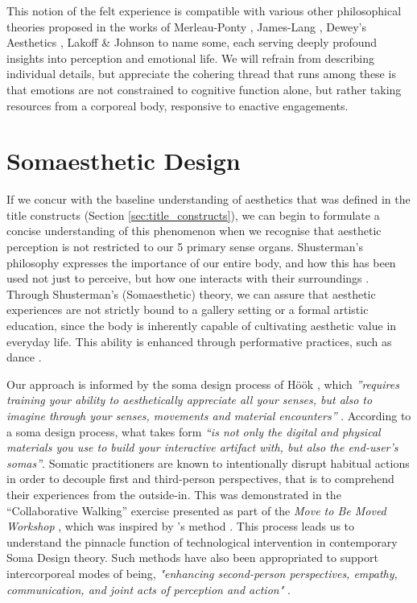 This notion of the felt experience is compatible with various other philosophical theories proposed in the works of Merleau-Ponty \cite{merleau-ponty_phenomenology_2012}, James-Lang \cite{cannon_james-lange_1927}, Dewey's Aesthetics \cite{dewey_aesthetic_1950}, Lakoff \& Johnson \cite{lakoff_philosophy_1999} to name some, each serving deeply profound insights into perception and emotional life. We will refrain from describing individual details, but appreciate the cohering thread that runs among these is that emotions are not constrained to cognitive function alone, but rather taking resources from a corporeal body, responsive to enactive engagements.

\section{Somaesthetic Design}

If we concur with the baseline understanding of aesthetics that was defined in the title constructs (Section \ref{sec:title_constructs}), we can begin to formulate a concise understanding of this phenomenon when we recognise that aesthetic perception is not restricted to our 5 primary sense organs. Shusterman's philosophy expresses the importance of our entire body, and how this has been used not just to perceive, but how one interacts with their surroundings \cite{shusterman_body_2008}. Through Shusterman’s (Somaesthetic) theory, we can assure that aesthetic experiences are not strictly bound to a gallery setting or a formal artistic education, since the body is inherently capable of cultivating aesthetic value in everyday life. This ability is enhanced through performative practices, such as dance \cite{eric_c_mullis_performative_2006,shusterman_body_2012}.

Our approach is informed by the soma design process of Höök \cite{hook_designing_2018}, which \textit{''requires training your ability to aesthetically appreciate all your senses, but also to imagine through your senses, movements and material encounters''} \cite{hook_soma_2019}. According to a soma design process, what takes form \textit{``is not only the digital and physical materials you use to build your interactive artifact with, but also the end-user's somas''}. Somatic practitioners are known to intentionally disrupt habitual actions in order to decouple first and third-person perspectives, that is to comprehend their experiences from the outside-in. This was demonstrated in the  ``Collaborative Walking'' exercise presented as part of the \textit{Move to Be Moved Workshop} \cite{hook_embracing_2018}, which was inspired by \citeauthor{loke_moving_2013}'s method \cite{loke_moving_2013}. This process leads us to understand the pinnacle function of technological intervention in contemporary Soma Design theory. Such methods have also been appropriated to support intercorporeal modes of being, \textit{"enhancing second-person perspectives, empathy, communication, and joint acts of perception and action"} \cite{turmo_vidal_designing_2021}.

